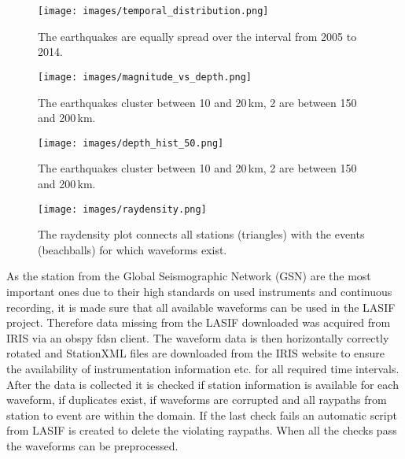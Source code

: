 \begin{figure}[H]
\begin{center}
\texttt{[image: images/temporal\_distribution.png]}
\caption{The earthquakes are equally spread over the interval from 2005 to 2014.}
\label{temp_dist}
\end{center}
\end{figure}

\begin{figure}[H]
\begin{center}
\texttt{[image: images/magnitude\_vs\_depth.png]}
\caption{The earthquakes cluster between 10 and 20\,km, 2 are between 150 and 200\,km.}
\label{depth_scatter}
\end{center}
\end{figure}

\begin{figure}[H]
\begin{center}
\texttt{[image: images/depth\_hist\_50.png]}
\caption{The earthquakes cluster between 10 and 20\,km, 2 are between 150 and 200\,km.}
\label{depth_dist}
\end{center}
\end{figure}

\begin{figure}[H]
\begin{center}
\texttt{[image: images/raydensity.png]}
\caption{The raydensity plot connects all stations (triangles) with the events (beachballs) for which waveforms exist.}
\label{raydens}
\end{center}
\end{figure}

As the station from the Global Seismographic Network (GSN) are the most important ones due to their high standards on used 
instruments and continuous recording, it is made sure that all available waveforms can be used in the LASIF project. 
Therefore data missing from the LASIF downloaded was acquired from IRIS via an obspy fdsn client. 
The waveform data is then horizontally correctly rotated and StationXML files are downloaded from the IRIS website to
ensure the availability of instrumentation information etc. for all required time intervals. \\

After the data is collected it is checked if station information is available for each waveform, if duplicates exist, if 
waveforms are corrupted and all raypaths from station to event are within the domain. 
If the last check fails an automatic script from LASIF is created to delete the violating raypaths. 
When all the checks pass the waveforms can be preprocessed. 



